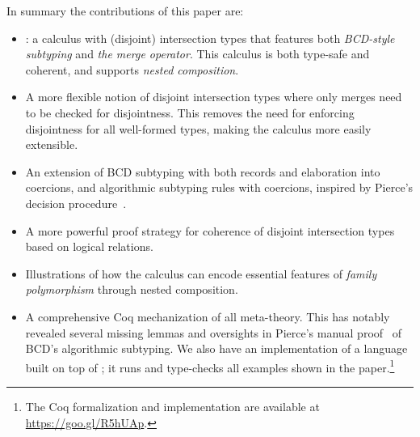 In summary the contributions of this paper are:
\begin{itemize}

\item \name: a calculus with (disjoint) intersection types
that features both \emph{BCD-style subtyping} and \emph{the merge operator}.
This calculus is both type-safe and coherent, and supports \emph{nested
composition}. 

\item A more flexible notion of disjoint intersection types where 
only merges need to be checked for disjointness. This removes the need 
for enforcing disjointness for all well-formed types, making the
calculus more easily extensible.

\item An extension of BCD subtyping with both records and elaboration into coercions, 
  and
  algorithmic subtyping rules with coercions, inspired by
  Pierce's decision
  procedure~\citep{pierce1989decision}.

\item A more powerful proof strategy for coherence of disjoint
  intersection types based on logical
  relations. 

\item Illustrations of how the calculus can encode essential features 
of \emph{family polymorphism} through nested composition.

\item A comprehensive Coq mechanization of all meta-theory. This has notably revealed
  several missing lemmas and oversights
  in Pierce's manual proof~\citep{pierce1989decision} of BCD's algorithmic
  subtyping. %
  We also have an implementation of a language built on top of \name; it runs and type-checks all examples shown in
  the paper.\footnote{The Coq formalization and implementation are available at \url{https://goo.gl/R5hUAp}.}


\end{itemize}

